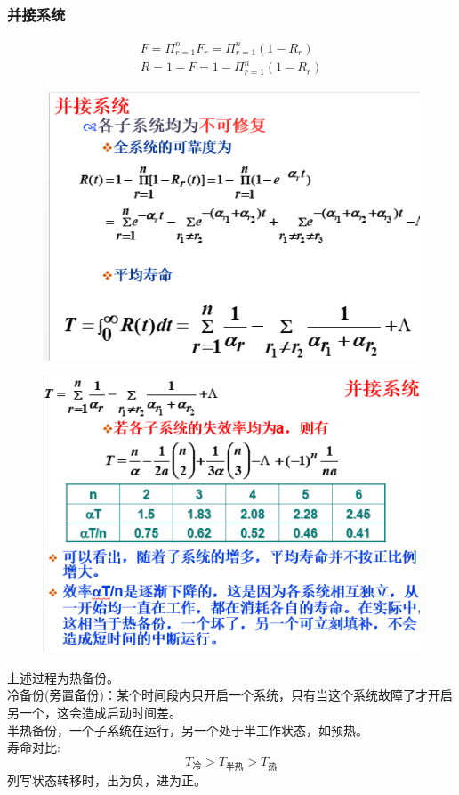 \subsubsection{并接系统}
\begin{gather}\label{key}
F = \varPi_{r = 1}^{n}F_r = \varPi_{r = 1}^{n} (1-R_r)\\
R= 1-F = 1- \varPi_{r = 1}^{n} (1-R_r)
\end{gather}
\begin{figure}[H]
	\centering
	\includegraphics[width=0.7\linewidth]{figures/screenshot095}
	\caption{}
	\label{fig:screenshot095}
\end{figure}
\begin{figure}[H]
	\centering
	\includegraphics[width=0.7\linewidth]{figures/screenshot096}
	\caption{}
	\label{fig:screenshot096}
\end{figure}
上述过程为热备份。\\
冷备份(旁置备份)：某个时间段内只开启一个系统，只有当这个系统故障了才开启另一个，这会造成启动时间差。\\
半热备份，一个子系统在运行，另一个处于半工作状态，如预热。\\
寿命对比:
\[
T_\text{冷} > T_\text{半热} >T_\text{热} 
\]
列写状态转移时，出为负，进为正。
